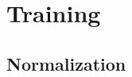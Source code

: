 \section{Training} \label{sec:training}

\subsection{Normalization} \label{subsec:normalization}






